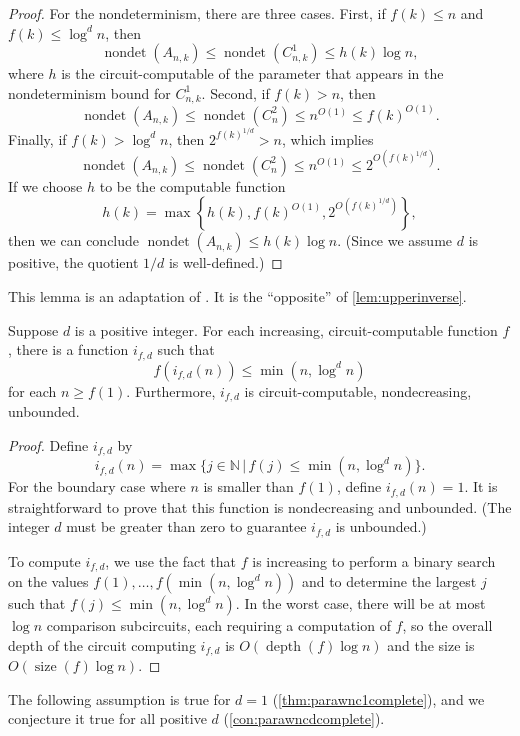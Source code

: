 \documentclass{article}
\DeclareMathOperator{\depth}{depth}
\DeclareMathOperator{\nondet}{nondet}
\DeclareMathOperator{\size}{size}
\begin{document}
\begin{proof}
  For the nondeterminism, there are three cases.
  First, if $f(k) \leq n$ and $f(k) \leq \log^d n$, then
  \[
  \nondet(A_{n, k}) \leq \nondet(C^1_{n, k}) \leq h(k) \log n,
  \]
  where $h$ is the circuit-computable of the parameter that appears in the nondeterminism bound for $C^1_{n, k}$.
  Second, if $f(k) > n$, then
  \[
  \nondet(A_{n, k}) \leq \nondet(C^2_n) \leq n^{O(1)} \leq f(k)^{O(1)}.
  \]
  Finally, if $f(k) > \log^d n$, then $2^{f(k)^{1 / d}} > n$, which implies
  \[
  \nondet(A_{n, k}) \leq \nondet(C^2_n) \leq n^{O(1)} \leq 2^{O\left(f(k)^{1 / d}\right)}.
  \]
  If we choose $h$ to be the computable function
  \[
  h(k) = \max \left\{ h(k), f(k)^{O(1)}, 2^{O\left(f(k)^{1 / d}\right)} \right\},
  \]
  then we can conclude $\nondet(A_{n, k}) \leq h(k) \log n$.
  (Since we assume $d$ is positive, the quotient $1 / d$ is well-defined.)
\end{proof}

This lemma is an adaptation of \autocite[Lemma~3.24]{fg06}.
It is the ``opposite'' of \autoref{lem:upperinverse}.

\begin{lemma}\label{lem:lowerinverse}
  Suppose $d$ is a positive integer.
  For each increasing, circuit-computable function $f$, there is a function $i_{f, d}$ such that
  \[
  f(i_{f, d}(n)) \leq \min(n, \log^d n)
  \]
  for each $n \geq f(1)$.
  Furthermore, $i_{f, d}$ is circuit-computable, nondecreasing, unbounded.
\end{lemma}
\begin{proof}
  Define $i_{f, d}$ by
  \[
  i_{f, d}(n) = \max\{ j \in \mathbb{N} \, | \, f(j) \leq \min(n, \log^d n) \}.
  \]
  For the boundary case where $n$ is smaller than $f(1)$, define $i_{f, d}(n) = 1$.
  It is straightforward to prove that this function is nondecreasing and unbounded.
  (The integer $d$ must be greater than zero to guarantee $i_{f, d}$ is unbounded.)

  To compute $i_{f, d}$, we use the fact that $f$ is increasing to perform a binary search on the values $f(1), \dotsc, f(\min(n, \log^d n))$ and to determine the largest $j$ such that $f(j) \leq \min(n, \log^d n)$.
  In the worst case, there will be at most $\log n$ comparison subcircuits, each requiring a computation of $f$, so the overall depth of the circuit computing $i_{f, d}$ is $O(\depth(f) \log n)$ and the size is $O(\size(f) \log n)$.
\end{proof}

The following assumption is true for $d = 1$ (\autoref{thm:parawnc1complete}), and we conjecture it true for all positive $d$ (\autoref{con:parawncdcomplete}).
\end{document}
